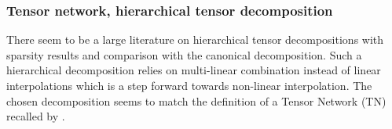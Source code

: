 \subsubsection{Tensor network, hierarchical tensor decomposition}

There seem to be a large literature on hierarchical tensor decompositions \parencite{bachmayr_tensor_2016,zniyed_tt-based_2020} with sparsity results and comparison with the canonical decomposition. Such a hierarchical decomposition relies on multi-linear combination instead of linear interpolations which is a step forward towards non-linear interpolation. The chosen decomposition seems to match the definition of a Tensor Network (TN) recalled by \cite{zniyed_tt-based_2020}.
